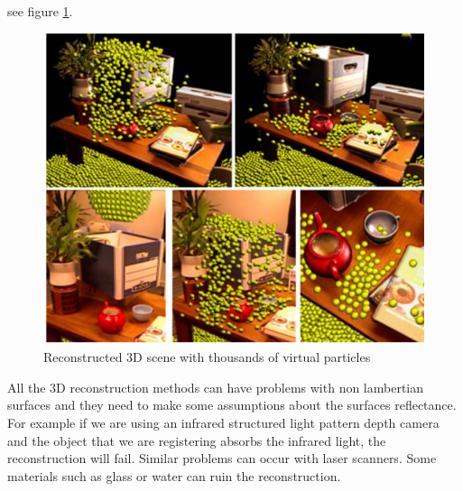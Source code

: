  see figure \ref{fig:izadi}.

\begin{figure}[h!]
\begin{center}
\includegraphics[scale=0.34]{images/izadi}
\caption{Reconstructed 3D scene with thousands of virtual particles}
\label{fig:izadi}
\end{center}
\end{figure}


All the 3D reconstruction methods can have problems with non lambertian 
surfaces and they need to make some assumptions about the surfaces reflectance. For example if we are using an infrared structured light pattern depth camera and the object that we are registering absorbs the infrared light, the reconstruction will fail. Similar problems can occur with laser scanners. Some materials such as glass or water can ruin the reconstruction.
